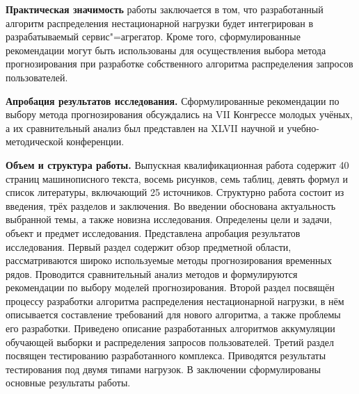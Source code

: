 {\bfseries Практическая значимость} работы заключается в том, что 
разработанный алгоритм распределения нестационарной нагрузки будет
интегрирован в разрабатываемый сервис"=агрегатор. Кроме того, 
сформулированные рекомендации могут быть использованы для осуществления 
выбора метода прогнозирования при разработке собственного алгоритма 
распределения запросов пользователей.

{\bfseries Апробация результатов исследования.} Сформулированные 
рекомендации по выбору метода прогнозирования обсуждались на VII Конгрессе 
молодых учёных, а их сравнительный анализ был представлен на XLVII научной 
и учебно-методической конференции.

{\bfseries Объем и структура работы.} 
Выпускная квалификационная работа содержит 40 страниц машинописного 
текста, восемь рисунков, семь таблиц, девять формул и список литературы, 
включающий 25 источников. Структурно работа состоит из введения, трёх 
разделов и заключения. Во введении обоснована актуальность выбранной темы, 
а также новизна исследования. Определены цели и задачи, объект и предмет 
исследования. Представлена апробация результатов исследования. Первый 
раздел содержит обзор предметной области, рассматриваются широко 
используемые методы прогнозирования временных рядов. Проводится 
сравнительный анализ методов и формулируются рекомендации по выбору 
моделей прогнозирования. Второй раздел посвящён процессу разработки 
алгоритма распределения нестационарной нагрузки, в нём описывается 
составление требований для нового алгоритма, а также проблемы его 
разработки. Приведено описание разработанных алгоритмов аккумуляции 
обучающей выборки и распределения запросов пользователей. Третий раздел 
посвящен тестированию разработанного комплекса. Приводятся результаты 
тестирования под двумя типами нагрузок. В заключении сформулированы 
основные результаты работы.
